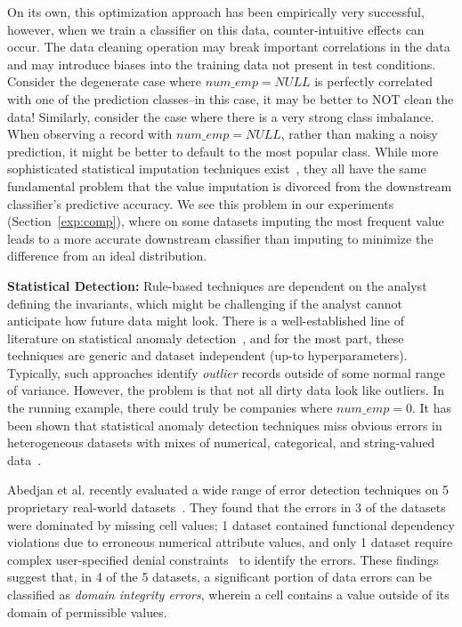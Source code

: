 On its own, this optimization approach has been empirically very successful, however, when we train a classifier on this data, counter-intuitive effects can occur.  
The data cleaning operation may break important correlations in the data and may introduce biases into the training data not present in test conditions. 
Consider the degenerate case where $num\_emp = NULL$ is perfectly correlated with one of the prediction classes--in this case, it may be better to NOT clean the data!
Similarly, consider the case where there is a very strong class imbalance.
When observing a record with $num\_emp = NULL$, rather than making a noisy prediction, it might be better to default to the most popular class. 
While more sophisticated statistical imputation techniques exist~\cite{schafer1998multiple}, they all have the same fundamental problem that the value imputation is divorced from the downstream classifier's predictive accuracy. 
We see this problem in our experiments (Section~\ref{exp:comp}), where on some datasets imputing the most frequent value leads to a more accurate downstream classifier than imputing to minimize the difference from an ideal distribution.

\vspace{0.5em}\noindent\textbf{Statistical Detection: } Rule-based techniques are dependent on the analyst defining the invariants, which might be challenging if the analyst cannot anticipate how future data might look.
There is a well-established line of literature on statistical anomaly detection~\cite{hellerstein2008quantitative}, and for the most part, these techniques are generic and dataset independent (up-to hyperparameters). Typically, such approaches identify \emph{outlier} records outside of some normal range of variance. However, the problem is that not all dirty data look like outliers. In the running example, there could truly be companies where $num\_emp = 0$. It has been shown that statistical anomaly detection techniques miss obvious errors in heterogeneous datasets with mixes of numerical, categorical, and string-valued data~\cite{DBLP:journals/pvldb/AbedjanCDFIOPST16}.

Abedjan et al. recently evaluated a wide range of error detection techniques on 5 proprietary real-world datasets~\cite{DBLP:journals/pvldb/AbedjanCDFIOPST16}.  They found that the errors in 3 of the datasets were dominated by missing cell values; 1 dataset contained functional dependency violations due to erroneous numerical attribute values, and only 1 dataset require complex user-specified denial constraints~\cite{chu2013discovering} to identify the errors.  These findings suggest that, in 4 of the 5 datasets, a significant portion of data errors can be classified as {\it domain integrity errors}, wherein a cell contains a value outside of its domain of permissible values.

